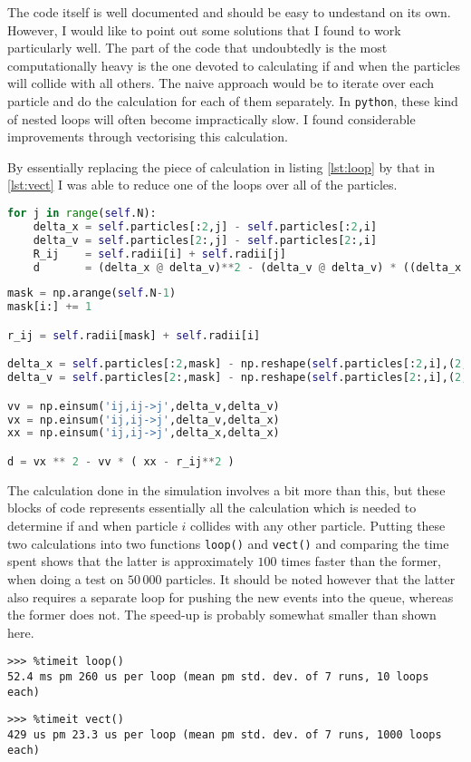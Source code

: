 The code itself is well documented and should be easy to undestand on its own. However, I would like to point out some solutions that I found to work particularly well. The part of the code that undoubtedly is the most computationally heavy is the one devoted to calculating if and when the particles will collide with all others. The naive approach would be to iterate over each particle and do the calculation for each of them separately. In \texttt{python}, these kind of nested loops will often become impractically slow. I found considerable improvements through vectorising this calculation. 

By essentially replacing the piece of calculation in listing \ref{lst:loop} by that in \ref{lst:vect} I was able to reduce one of the loops over all of the particles.

\begin{lstlisting}[language=Python,caption= Loop over all particles.,label={lst:loop}]
for j in range(self.N):
	delta_x = self.particles[:2,j] - self.particles[:2,i]
	delta_v = self.particles[2:,j] - self.particles[2:,i]
	R_ij    = self.radii[i] + self.radii[j]
	d       = (delta_x @ delta_v)**2 - (delta_v @ delta_v) * ((delta_x @ delta_x) - R_ij**2)
\end{lstlisting}

\begin{lstlisting}[language=Python, caption= Vectorized calculation., label={lst:vect}]
mask = np.arange(self.N-1)
mask[i:] += 1

r_ij = self.radii[mask] + self.radii[i]

delta_x = self.particles[:2,mask] - np.reshape(self.particles[:2,i],(2,1))
delta_v = self.particles[2:,mask] - np.reshape(self.particles[2:,i],(2,1))

vv = np.einsum('ij,ij->j',delta_v,delta_v)
vx = np.einsum('ij,ij->j',delta_v,delta_x)
xx = np.einsum('ij,ij->j',delta_x,delta_x)

d = vx ** 2 - vv * ( xx - r_ij**2 )
\end{lstlisting}

The calculation done in the simulation involves a bit more than this, but these blocks of code represents essentially all the calculation which is needed to determine if and when particle $i$ collides with any other particle. Putting these two calculations into two functions \texttt{loop()} and \texttt{vect()} and comparing the time spent shows that the latter is approximately $100$ times faster than the former, when doing a test on $50\,000$ particles. It should be noted however that the latter also requires a separate loop for pushing the new events into the queue, whereas the former does not. The speed-up is probably somewhat smaller than shown here.

\begin{lstlisting}
>>> %timeit loop()
52.4 ms pm 260 us per loop (mean pm std. dev. of 7 runs, 10 loops each)
\end{lstlisting}

\begin{lstlisting}
>>> %timeit vect()
429 us pm 23.3 us per loop (mean pm std. dev. of 7 runs, 1000 loops each)
\end{lstlisting}
